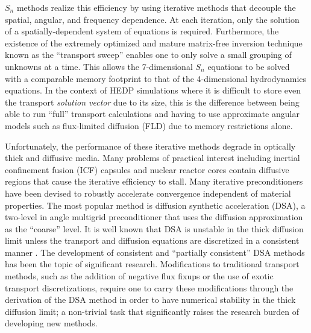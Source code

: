 \documentclass[../doc.tex]{subfiles}
\begin{document}
$S_n$ methods realize this efficiency by using iterative methods that decouple the spatial, angular, and frequency dependence. At each iteration, only the solution of a spatially-dependent system of equations is required. Furthermore, the existence of the extremely optimized and mature matrix-free inversion technique known as the ``transport sweep'' enables one to only solve a small grouping of unknowns at a time. This allows the 7-dimensional $S_n$ equations to be solved with a comparable memory footprint to that of the 4-dimensional hydrodynamics equations. In the context of HEDP simulations where it is difficult to store even the transport \emph{solution vector} due to its size, this is the difference between being able to run ``full'' transport calculations and having to use approximate angular models such as flux-limited diffusion (FLD) due to memory restrictions alone. 

Unfortunately, the performance of these iterative methods degrade in optically thick and diffusive media. Many problems of practical interest including inertial confinement fusion (ICF) capsules and nuclear reactor cores contain diffusive regions that cause the iterative efficiency to stall. Many iterative preconditioners have been devised to robustly accelerate convergence independent of material properties. The most popular method is diffusion synthetic acceleration (DSA), a two-level in angle multigrid preconditioner that uses the diffusion approximation as the ``coarse'' level. It is well known that DSA is unstable in the thick diffusion limit unless the transport and diffusion equations are discretized in a consistent manner \cite{A,LarsenDSA}. The development of consistent \cite{WWM} and ``partially consistent'' \cite{ML,AM,WR} DSA methods has been the topic of significant research. Modifications to traditional transport methods, such as the addition of negative flux fixups or the use of exotic transport discretizations, require one to carry these modifications through the derivation of the DSA method in order to have numerical stability in the thick diffusion limit; a non-trivial task that significantly raises the research burden of developing new methods. 
\end{document}
